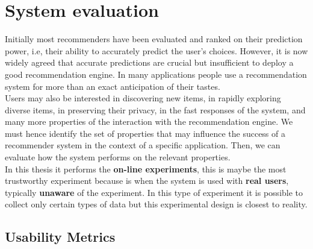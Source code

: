 \chapter{System evaluation} \label{evaluation}

Initially most recommenders have been evaluated and ranked on their
prediction power, i.e, their ability to accurately predict the user's
choices. However, it is now widely agreed that accurate predictions
are crucial but insufficient to deploy a good recommendation engine.
In many applications people use a recommendation system for more than
an exact anticipation of their tastes.\\ Users may also be interested
in discovering new items, in rapidly exploring diverse items, in
preserving their privacy, in the fast responses of the system, and
many more properties of the interaction with the recommendation
engine. We must hence identify the set of properties that may
influence the success of a recommender system in the context of a
specific application. Then, we can evaluate how the system performs on
the relevant properties\cite{adomavicius2011context}.\\ 
In this thesis it performs the \textbf{on-line experiments}, 
this is maybe the most trustworthy experiment because is when 
the system is  used with \textbf{real users}, typically 
\textbf{unaware} of the experiment. In this type of experiment 
it is possible to collect only certain types
of data but this experimental design is closest to reality.

\section{Usability Metrics}

